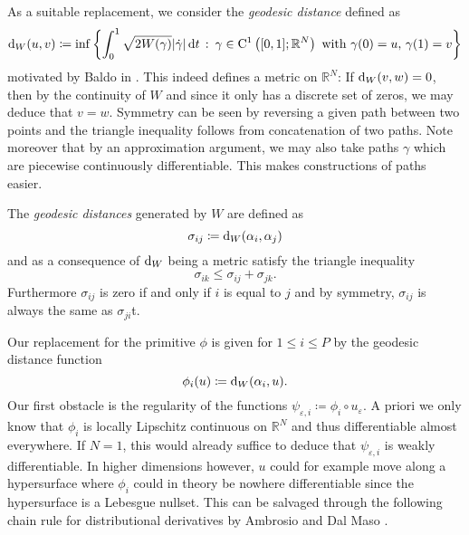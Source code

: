 As a suitable replacement, we consider the \emph{geodesic distance} defined as 
\begin{equation*}
		\geodesic_distance ( u, v )
		\coloneqq
		\inf
		\left\{
		\int_{ 0 }^{ 1 }
		\sqrt{ 2 W ( \gamma ) }
		\abs{ \dot{ \gamma }  }
		\dd{t}
		\,
		\colon
		\, \gamma \in \mathrm{ C }^{ 1 } \left( [0, 1 ] ; \mathbb{ R }^{ N } \right) \text{ with } \gamma( 0 ) = u,\, \gamma( 1 )= v 
		\right\}
\end{equation*}
motivated by Baldo in \cite{baldo_minimal_interface_criterion}.
This indeed defines a metric on $ \mathbb{ R }^{ N } $: If $ \geodesic_distance 
( v, w ) = 0 $, then by the continuity of $ W $ and since it only has a 
discrete set of zeros, we may deduce that $ v = w $. Symmetry can be seen by 
reversing a given path between two points and the triangle inequality follows 
from concatenation of two paths.
Note moreover that by an approximation argument, we may also take paths $ 
\gamma $ which are piecewise continuously differentiable. This makes 
constructions of paths easier.

The \emph{geodesic distances} generated by $ W $  are defined as
\begin{equation}
	\label{definition_surface_tensions}
	\sigma_{ i j } 
	\coloneqq
	\geodesic_distance ( \alpha_{ i } , \alpha_{ j } )
\end{equation}
and as a consequence of $ \geodesic_distance $ being a metric satisfy the 
triangle inequality
\begin{equation*}
	\sigma_{ i k } \leq \sigma_{ i j } + \sigma_{ j k }.
\end{equation*}
Furthermore $ \sigma_{ i j } $ is zero if and only if $ i $ is equal to $ j $ 
and by symmetry, $ \sigma_{ i 
j } $ is always the same as $ \sigma_{ j i } $t.

Our replacement for the primitive $ \phi $ is given for $ 1 \leq i \leq P $ 
by the geodesic distance function
\begin{equation*}
	\phi_{ i } ( u ) 
	\coloneqq
	\geodesic_distance ( \alpha_{ i } , u ).
\end{equation*}
Our first obstacle is the regularity of the functions $ \psi_{ \varepsilon, i } 
\coloneqq \phi_{ i } \circ u_{ \varepsilon } $. A priori we only know that $ 
\phi_{ i } $ is locally Lipschitz continuous on $ \mathbb{ R }^{ N } $ and thus 
differentiable almost everywhere. If $ N = 1 $, this would already suffice 
to deduce that $ \psi_{ \varepsilon, i  }$ is weakly differentiable.
In higher dimensions however, $ u $ could for example move along a hypersurface 
where $ 
\phi_{ i } $ could in theory be nowhere differentiable since the hypersurface  
is a Lebesgue 
nullset. 
This can be salvaged through the following chain rule for 
distributional derivatives by Ambrosio and Dal Maso 
\cite[Cor.~3.2]{ambrosio_maso_chain_rule}.

